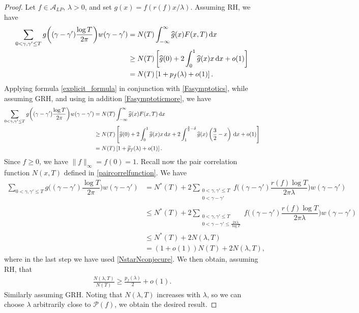 \documentclass[reqno]{amsart}
\newcommand{\A}{\mathcal{A}}
\renewcommand{\P}{\mathcal{P}}
\newcommand{\ft}{\widehat}
\newcommand{\wt}{\widetilde}
\newcommand{\la}{\lambda}
\renewcommand{\d}{\,\text{\rm d}}
\begin{document}
\begin{proof}
Let $f\in\A_{LP}$, $\lambda>0$, and set $g(x)= f(r(f)x/\la)$. Assuming RH, we have 
\begin{align*}
\sum_{0<\gamma, \gamma'\leq T}g\bigg((\gamma-\gamma')\dfrac{\log T}{2\pi}\bigg)w(\gamma-\gamma') 
&= N(T)\int_{-\infty}^{\infty}\widehat{g}(x)F(x,T)\d x\\
&\geq N(T)\left[\ft g(0)+2\int_{0}^{1}\ft g(x)x\d x+o(1)\right]
 \\ & = N(T)\left[1+p_f(\la)+o(1)\right].
\end{align*}
Applying formula \eqref{explicit_formula} in conjunction with \eqref{Fasymptotics}, while assuming GRH, and using in addition \eqref{Fasymptoticmore}, we have
\begin{align*}
\sum_{0<\gamma, \gamma'\leq T}g\bigg((\gamma-\gamma')\dfrac{\log T}{2\pi}\bigg)w(\gamma-\gamma') 
&= N(T)\int_{-\infty}^{\infty}\widehat{g}(x)F(x,T)\d x\\
&\geq N(T)\left[\ft g(0)+2\int_{0}^{1}\ft g(x)x\d x + 2\int_1^{\frac32-\delta}\ft g(x)\left(\frac{3}{2}-x\right)\d x + o(1)\right]\\
&= N(T)\left[1+\wt p_f(\la)+o(1)\right].
\end{align*}
Since $\ft f\geq 0$, we have $\|f\|_{\infty}=f(0)=1$. Recall now the pair correlation function $N(x,T)$ defined in \eqref{paircorrelfunction}. We have
\begin{align*}
\sum_{0<\gamma, \gamma'\leq T}g\bigg((\gamma-\gamma')\dfrac{\log T}{2\pi}\bigg)w(\gamma-\gamma') & = N^*(T) +2\sum_{\substack{0<\gamma, \gamma'\leq T\\ 0<\gamma-\gamma'}}f\bigg((\gamma-\gamma')\dfrac{r(f)\log T}{2\pi\la}\bigg)w(\gamma-\gamma')  \\
& \leq N^*(T) +2\sum_{\substack{0<\gamma, \gamma'\leq T\\ 0<\gamma-\gamma' \leq \frac{2\pi \la}{\log T}}}f\bigg((\gamma-\gamma')\dfrac{r(f)\log T}{2\pi\la}\bigg)w(\gamma-\gamma') \\
& \leq N^*(T)+2N(\la,T) \\ & = (1+o(1))N(T) + 2N(\la,T),
\end{align*}
where in the last step we have used \eqref{NstarNconjecure}. We then obtain, assuming RH, that 
\begin{align*} %
\frac{N(\la,T)}{N(T)}\geq \frac{p_f(\la)}{2}+o(1).
\end{align*}
Similarly assuming GRH. Noting that $N(\la,T)$ increases with $\la$, so we can choose $\la$ arbitrarily close to $\P(f)$, we obtain the desired result.
\end{proof}
\end{document}
